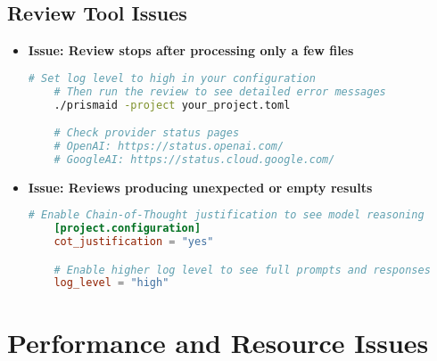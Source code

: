 \subsection{Review Tool Issues}

\begin{itemize}
    \item \textbf{Issue: Review stops after processing only a few files}

    \begin{commandbox}
    \begin{lstlisting}[language=Bash]
    # Set log level to high in your configuration
    # Then run the review to see detailed error messages
    ./prismaid -project your_project.toml

    # Check provider status pages
    # OpenAI: https://status.openai.com/
    # GoogleAI: https://status.cloud.google.com/
    \end{lstlisting}
    \end{commandbox}

    \item \textbf{Issue: Reviews producing unexpected or empty results}

    \begin{configbox}
    \begin{lstlisting}[language=TOML]
    # Enable Chain-of-Thought justification to see model reasoning
    [project.configuration]
    cot_justification = "yes"

    # Enable higher log level to see full prompts and responses
    log_level = "high"
    \end{lstlisting}
    \end{configbox}

\end{itemize}

\section{Performance and Resource Issues}

